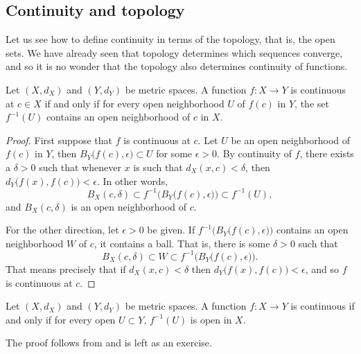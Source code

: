 \documentclass[12pt]{book}
\begin{document}
\subsection*{Continuity and topology}

Let us see how to define continuity in terms of the topology, that is,
the open sets.
We have already seen that topology determines which 
sequences converge, and so it is no wonder that the topology also
determines continuity of functions.

\begin{lemma} \label{lemma:mstopocontloc}
Let $(X,d_X)$ and $(Y,d_Y)$ be metric spaces.
A function $f \colon X \to Y$ is continuous at $c \in X$
if and only if for every open neighborhood $U$ of $f(c)$ in $Y$, the set
$f^{-1}(U)$ contains an open neighborhood of $c$ in $X$.
\end{lemma}

\begin{proof}
First suppose that $f$ is continuous at $c$.
Let $U$ be an open neighborhood of $f(c)$
in $Y$, then $B_Y\bigl(f(c),\epsilon\bigr) \subset U$ for some $\epsilon >
0$.
By continuity of $f$, there exists a $\delta > 0$
such that whenever $x$ is such that $d_X(x,c) < \delta$, then
$d_Y\bigl(f(x),f(c)\bigr) < \epsilon$.
In other words,
\begin{equation*}
B_X(c,\delta) \subset f^{-1}\bigl(B_Y\bigl(f(c),\epsilon\bigr)\bigr) \subset
f^{-1}(U) ,
\end{equation*}
and $B_X(c,\delta)$ is an open neighborhood of $c$.

For the other direction,
let $\epsilon > 0$ be given.
If
$f^{-1}\bigl(B_Y\bigl(f(c),\epsilon\bigr)\bigr)$ contains an open
neighborhood $W$ of $c$, it contains a ball.
That is, there is some $\delta > 0$
such that
\begin{equation*}
B_X(c,\delta) \subset W \subset f^{-1}\bigl(B_Y\bigl(f(c),\epsilon\bigr)\bigr) .
\end{equation*}
That means precisely that if $d_X(x,c) < \delta$ then $d_Y\bigl(f(x),f(c)\bigr)
< \epsilon$, and so $f$ is continuous at $c$.
\end{proof}

\begin{thm} \label{thm:mstopocont}
Let $(X,d_X)$ and $(Y,d_Y)$ be metric spaces.
A function $f \colon X \to Y$
is continuous if and only if
for every open $U \subset Y$, $f^{-1}(U)$ is open in $X$.
\end{thm}

The proof follows from  and is left as
an exercise.
\end{document}
